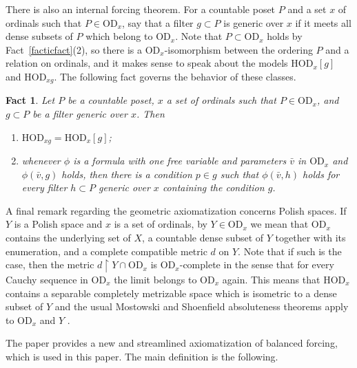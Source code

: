 \documentclass{article}
\newcommand{\hvd}{\mathrm{HOD}}
\newcommand{\vd}{\mathrm{OD}}
\newtheorem{fact}[theorem]{Fact}
\theoremstyle{definition}
\begin{document}
	
	
	\noindent There is also an internal forcing theorem. For a countable poset $P$ and a set $x$ of ordinals such that $P\in\vd_x$, say that a filter $g\subset P$ is generic over $x$ if it meets all dense subsets of $P$ which belong to $\vd_x$. Note that $P\subset\vd_x$ holds by Fact~\ref{facticfact}(2), so there is a $\vd_x$-isomorphism between the ordering $P$ and a relation on ordinals, and it makes sense to speak about the models $\hvd_x[g]$ and $\hvd_{xg}$. The following fact governs the behavior of these classes.

\begin{fact}
\label{factgen}
Let $P$ be a countable poset, $x$ a set of ordinals such that $P\in\vd_x$, and $g\subset P$ be a filter generic over $x$. Then

\begin{enumerate}
\item $\hvd_{xg}=\hvd_x[g]$;
\item whenever $\phi$ is a formula with one free variable and parameters $\bar v$ in $\vd_x$ and $\phi(\bar v, g)$ holds, then there is a condition $p\in g$ such that $\phi(\bar v, h)$ holds for every filter $h\subset P$ generic over $x$ containing the condition $g$.
\end{enumerate}
\end{fact}

\noindent A final remark regarding the geometric axiomatization concerns Polish spaces. If $Y$ is a Polish space and $x$ is a set of ordinals, by $Y\in\vd_x$ we mean that $\vd_x$ contains the underlying set of $X$, a countable dense subset of $Y$ together with its enumeration, and a complete compatible metric $d$ on $Y$. Note that if such is the case, then the metric $d\restriction Y\cap\vd_x$ is $\vd_x$-complete in the sense that for every Cauchy sequence in $\vd_x$ the limit belongs to $\vd_x$ again. This means that $\hvd_x$ contains a separable completely metrizable space which is isometric to a dense subset of $Y$ and the usual Mostowski and Shoenfield absoluteness theorems apply to $\vd_x$ and $Y$ \cite{z:interpretations}.
	
The paper \cite{z:reloadedB} provides a new and streamlined axiomatization of balanced forcing, which is used in this paper. The main definition is the following.
	
\end{document}
